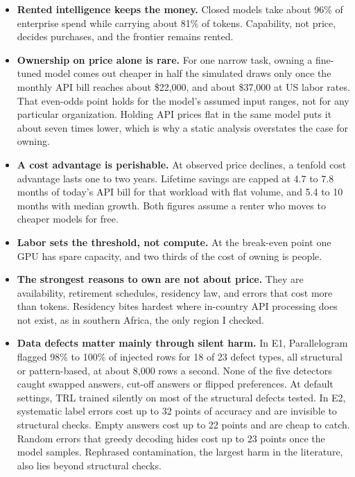 \begin{itemize}
\tightlist
\item
  \textbf{Rented intelligence keeps the money.}  Closed models take about 96\% of enterprise spend while carrying about 81\% of tokens. Capability, not price, decides purchases, and the frontier remains rented.
\item
  \textbf{Ownership on price alone is rare.}  For one narrow task, owning a fine-tuned model comes out cheaper in half the simulated draws only once the monthly API bill reaches about \$22,000, and about \$37,000 at US labor rates. That even-odds point holds for the model's assumed input ranges, not for any particular organization. Holding API prices flat in the same model puts it about seven times lower, which is why a static analysis overstates the case for owning.
\item
  \textbf{A cost advantage is perishable.}  At observed price declines, a tenfold cost advantage lasts one to two years. Lifetime savings are capped at 4.7 to 7.8 months of today's API bill for that workload with flat volume, and 5.4 to 10 months with median growth. Both figures assume a renter who moves to cheaper models for free.
\item
  \textbf{Labor sets the threshold, not compute.}  At the break-even point one GPU has spare capacity, and two thirds of the cost of owning is people.
\item
  \textbf{The strongest reasons to own are not about price.}  They are availability, retirement schedules, residency law, and errors that cost more than tokens. Residency bites hardest where in-country API processing does not exist, as in southern Africa, the only region I checked.
\item
  \textbf{Data defects matter mainly through silent harm.}  In E1, Parallelogram flagged 98\% to 100\% of injected rows for 18 of 23 defect types, all structural or pattern-based, at about 8,000 rows a second. None of the five detectors caught swapped answers, cut-off answers or flipped preferences. At default settings, TRL trained silently on most of the structural defects tested. In E2, systematic label errors cost up to 32 points of accuracy and are invisible to structural checks. Empty answers cost up to 22 points and are cheap to catch. Random errors that greedy decoding hides cost up to 23 points once the model samples. Rephrased contamination, the largest harm in the literature, also lies beyond structural checks.
\end{itemize}

